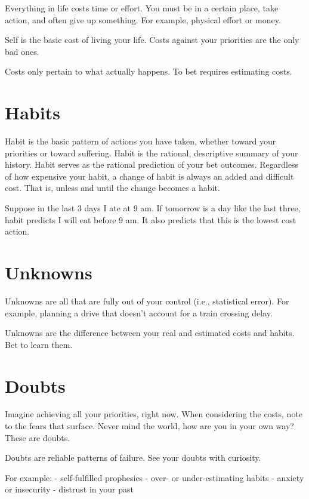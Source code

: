 \documentclass[
]{book}
\begin{document}
Everything in life costs time or effort.
You must be in a certain place, take action, and often give up something.
For example, physical effort or money.

Self is the basic cost of living your life.
Costs against your priorities are the only bad ones.

Costs only pertain to what actually happens.
To bet requires estimating costs.

\section{Habits}\label{habits}

Habit is the basic pattern of actions you have taken,
whether toward your priorities or toward suffering.
Habit is the rational, descriptive summary of your history.
Habit serves as the rational prediction of your bet outcomes.
Regardless of how expensive your habit, a change of habit is always an added and difficult cost.
That is, unless and until the change becomes a habit.

Suppose in the last 3 days I ate at 9 am.
If tomorrow is a day like the last three, habit predicts I will eat before 9 am.
It also predicts that this is the lowest cost action.

\section{Unknowns}\label{unknowns}

Unknowns are all that are fully out of your control (i.e., statistical error).
For example, planning a drive that doesn't account for a train crossing delay.

Unknowns are the difference between your real and estimated costs and habits.
Bet to learn them.

\section{Doubts}\label{doubts}

Imagine achieving all your priorities, right now.
When considering the costs, note to the fears that surface.
Never mind the world, how are you in your own way?
These are doubts.

Doubts are reliable patterns of failure.
See your doubts with curiosity.

For example:
- self-fulfilled prophesies
- over- or under-estimating habits
- anxiety or insecurity
- distrust in your past
\end{document}
